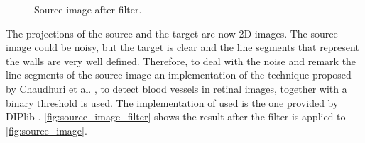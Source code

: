             \begin{figure}\centering
                \caption{Source image after filter.}
                \label{fig:source_image_filter}
            \end{figure}
        
            The projections of the source and the target are now 2D images. 
            The source image could be noisy, but the target is clear and the line segments that represent the walls are very well defined.
            Therefore, to deal with the noise and remark the line segments of the source image an implementation of the technique proposed 
            by Chaudhuri et al. \cite{Chaudhuri_1989_detection}, to detect blood vessels in retinal images, together with a binary threshold is used. 
            The implementation of \cite{Chaudhuri_1989_detection} used is the one provided by DIPlib \cite{DIPlib_library}.
            \autoref{fig:source_image_filter} shows the result after the filter is applied to \autoref{fig:source_image}.

